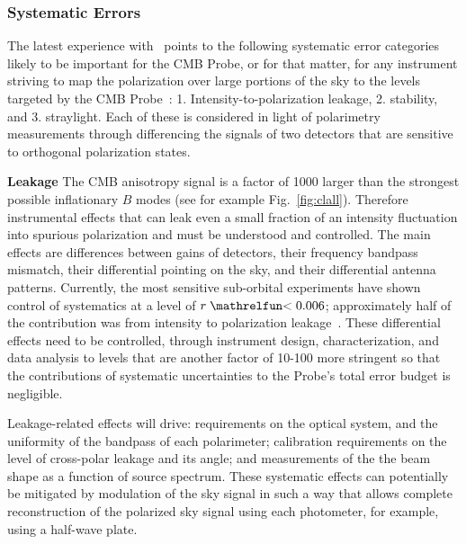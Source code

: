 
\subsubsection{Systematic Errors}
\vspace{-0.05in}

The latest experience with \planck\ points to the following systematic error categories likely to be important for 
the CMB Probe, or for that matter, for any instrument striving to map the polarization 
over large portions of the sky to the levels targeted by the CMB Probe~\cite{planck2016_xlvi}:
1. Intensity-to-polarization leakage, 2. stability, and 3. straylight. 
Each of these is considered in light of polarimetry measurements through
differencing the signals of two detectors that are sensitive to orthogonal polarization states. 

\textbf{Leakage} \hspace{0.1in} The CMB anisotropy signal is a factor of 1000 larger 
than the strongest possible inflationary $B$ modes (see for example Fig.~\ref{fig:clall}). 
Therefore instrumental effects that can leak
even a small fraction of an intensity fluctuation into spurious polarization and must be understood and controlled. The main effects are differences between gains of detectors, 
their frequency bandpass mismatch, their differential pointing on the sky, 
and their differential antenna patterns. Currently, the most sensitive sub-orbital 
experiments have shown control of systematics at a level of $r\simlt0.006$; 
approximately half of the contribution was from intensity to polarization leakage~\cite{bicep_systematics}. 
These differential effects need to be controlled, through 
instrument design, characterization, and data analysis to levels that are another 
factor of 10-100 more stringent so that the contributions of systematic uncertainties
to the Probe's total error budget is negligible.   

Leakage-related effects will drive: requirements on the optical system, and the uniformity of the
bandpass of each polarimeter;  calibration requirements on the level of cross-polar leakage and its angle; 
and measurements of the the beam shape as a function of source spectrum. 
These systematic effects can potentially be mitigated by modulation of the sky signal in
such a way that allows complete reconstruction of the 
polarized sky signal using each photometer, for example, using a
half-wave plate.  


